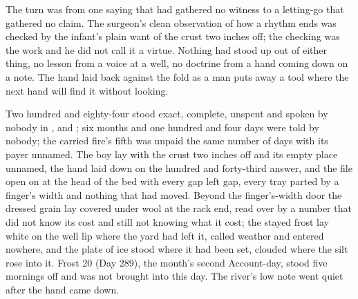 The turn was from one saying that had gathered no witness to a letting-go that gathered no claim. The surgeon's clean observation of how a rhythm ends was checked by the infant's plain want of the crust two inches off; the checking was the work and he did not call it a virtue. Nothing had stood up out of either thing, no lesson from a voice at a well, no doctrine from a hand coming down on a note. The hand laid back against the fold as a man puts away a tool where the next hand will find it without looking.

Two hundred and eighty-four stood exact, complete, unspent and spoken by nobody in ,  and ; six months and one hundred and four days were told by nobody; the carried fire's fifth was unpaid the same number of days with its payer unnamed. The boy lay with the crust two inches off and its empty place unnamed, the hand laid down on the hundred and forty-third answer, and the file open on  at the head of the bed with every gap left gap, every tray parted by a finger's width and nothing that had moved. Beyond the finger's-width door the dressed grain lay covered under wool at the rack end, read over by a number that did not know its cost and still not knowing what it cost; the stayed frost lay white on the well lip where the yard had left it, called weather and entered nowhere, and the plate of ice stood where it had been set, clouded where the silt rose into it. Frost 20 (Day 289), the month's second Account-day, stood five mornings off and was not brought into this day. The river's low note went quiet after the hand came down.
